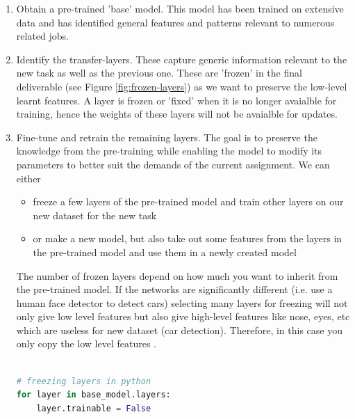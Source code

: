\documentclass[11pt]{article}
\begin{document}
\begin{enumerate}
    \item Obtain a pre-trained 'base' model. This model has been trained on extensive data and has identified general features and patterns relevant to numerous related jobs.
    \item Identify the transfer-layers. These capture generic information relevant to the new task as well as the previous one. These are 'frozen' in the final deliverable (see Figure \ref{fig:frozen-layers}) as we want to preserve the low-level learnt features. A layer is frozen or 'fixed' when it is no longer avaialble for training, hence the weights of these layers will not be avaialble for updates.
    \item Fine-tune and retrain the remaining layers. The goal is to preserve the knowledge from the pre-training while enabling the model to modify its parameters to better suit the demands of the current assignment. We can either
          \begin{itemize}
              \item freeze a few layers of the pre-trained model and train other layers on our new dataset for the new task
              \item or make a new model, but also take out some features from the layers in the pre-trained model and use them in a newly created model
          \end{itemize}
          The number of frozen layers depend on how much you want to inherit from the pre-trained model. If the networks are significantly different (i.e. use a human face detector to detect cars) selecting many layers for freezing will not only give low level features but also give high-level features like nose, eyes, etc which are useless for new dataset (car detection). Therefore, in this case you only copy the low level features \cite{geeks-transfer-learning}.

          \begin{lstlisting}[language=python] 
        
# freezing layers in python
for layer in base_model.layers: 
    layer.trainable = False

    \end{lstlisting}
\end{enumerate}
\end{document}

